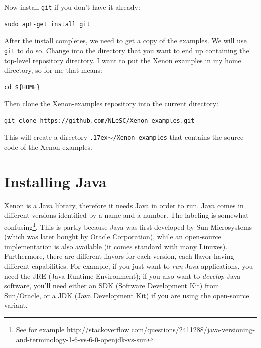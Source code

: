 \documentclass[12pt, a4paper, twoside, openany, titlepage]{book}
\newcommand{\mytilde}{\raise.17ex\hbox{$\scriptstyle\sim$}}
\begin{document}
Now install \texttt{git} if you don't have it already:
\begin{lstlisting}[style=basic,style=bash]
sudo apt-get install git
\end{lstlisting}

After the install completes, we need to get a copy of the examples. We will use \texttt{git} to do so. Change into the directory that you want to end up containing the top-level repository directory. I want to put the Xenon examples in my home directory, so for me that means:
\begin{lstlisting}[style=basic,style=bash]
cd ${HOME}
\end{lstlisting} %

Then clone the Xenon-examples repository into the current directory:
\begin{lstlisting}[style=basic,style=bash]
git clone https://github.com/NLeSC/Xenon-examples.git
\end{lstlisting}
This will create a directory \texttt{\mytilde{}/Xenon-examples} that contains the source code of the Xenon examples.






\section{Installing Java}

Xenon is a Java library, therefore it needs Java in order to run. Java comes in different versions identified by a name and a number. The labeling is somewhat confusing\footnote{See for example \url{http://stackoverflow.com/questions/2411288/java-versioning-and-terminology-1-6-vs-6-0-openjdk-vs-sun}}. This is partly because Java was first developed by Sun Microsystems (which was later bought by Oracle Corporation), while an open-source implementation is also available (it comes standard with many Linuxes). Furthermore, there are different flavors for each version, each flavor having different capabilities. For example, if you just want to \textit{run} Java applications, you need the JRE (Java Runtime Environment); if you also want to \textit{develop} Java software, you'll need either an SDK (Software Development Kit) from Sun/Oracle, or a JDK (Java Development Kit) if you are using the open-source variant.
\end{document}
